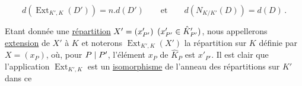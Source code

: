 \[ d(\operatorname{Ext}_{K',K}(D'))=n.d(D')\qquad\text{et}\qquad d(N_{K/K'}(D))=d(D)\,.\tag*{(38)} \]

Etant donnée une \uline{répartition}  $X'=(x'_{P'})$ $(x'_{P'}\in\hat K'_{P'})$, nous appellerons \uline{extension} de $X'$ à $K$ et noterons $\operatorname{Ext}_{K',K}(X')$ la répartition sur $K$ définie par $X=(x_P)$, où, pour $P\mid P'$, l'élément $x_P$ de $\hat K_P$ est $x'_{P'}$. Il est clair que l'application $\operatorname{Ext}_{K',K}$ est un \uline{isomorphisme} de l'anneau des répartitions sur $K'$ dans ce
